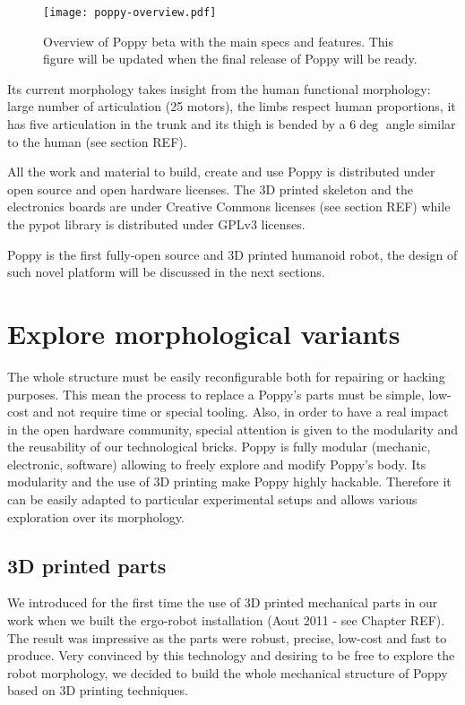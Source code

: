 \begin{figure}[tb]
    \begin{center}
        \texttt{[image: poppy-overview.pdf]}
    \end{center}
    \caption{Overview of Poppy beta with the main specs and features. This figure will be updated when the final release of Poppy will be ready.}
    \label{fig:poppyv0.1_overview}
\end{figure}

Its current morphology takes insight from the human functional morphology: large number of articulation (25 motors), the limbs respect human proportions, it has five articulation in the trunk and its thigh is bended by a $6\deg$ angle similar to the human (see section REF).

All the work and material to build, create and use Poppy is distributed under open source and open hardware licenses. The 3D printed skeleton and the electronics boards are under Creative Commons licenses (see section REF) while the pypot library is distributed under GPLv3 licenses.

Poppy is the first fully-open source and 3D printed humanoid robot, the design of such novel platform will be discussed in the next sections.



\section{Explore morphological variants} %

The whole structure must be easily reconfigurable both for repairing or hacking purposes. This mean the process to replace a Poppy's parts must be simple, low-cost and not require time or special tooling. Also, in order to have a real impact in the open hardware community, special attention is given to the modularity and the reusability of our technological bricks.
Poppy is fully modular (mechanic, electronic, software) allowing to freely explore and modify Poppy's body.
Its modularity and the use of 3D printing make Poppy highly hackable. Therefore it can be easily adapted to particular experimental setups and allows various exploration over its morphology.


\subsection{3D printed parts} %

We introduced for the first time the use of 3D printed mechanical parts in our work when we built the ergo-robot installation (Aout 2011 - see Chapter REF). The result was impressive as the parts were robust, precise, low-cost and fast to produce. Very convinced by this technology and desiring to be free to explore the robot morphology, we decided to build the whole mechanical structure of Poppy based on 3D printing techniques.

